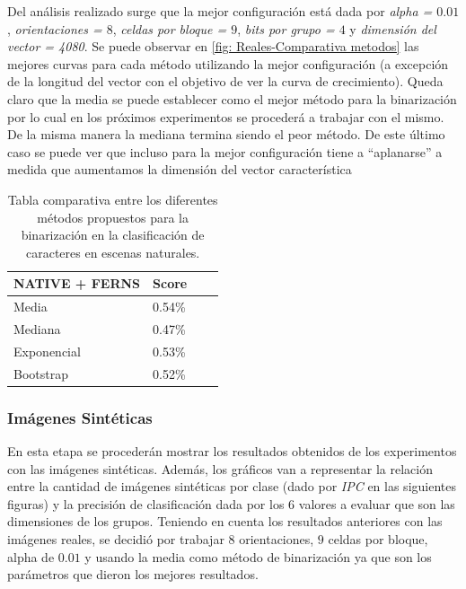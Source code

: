 	Del análisis realizado surge que la mejor configuración está dada por \textit{alpha = $0.01$}, \textit{orientaciones = $8$}, \textit{celdas por bloque = $9$}, \textit{bits por grupo = $4$} y \textit{dimensión del vector = 4080}. Se puede observar en \ref{fig: Reales-Comparativa metodos} las mejores curvas para cada método utilizando la mejor configuración (a excepción de la longitud del vector con el objetivo de ver la curva de crecimiento). Queda claro que la media se puede establecer como el mejor método para la binarización por lo cual en los próximos experimentos se procederá a trabajar con el mismo. De la misma manera la mediana termina siendo el peor método. De este último caso se puede ver que incluso para la mejor configuración tiene a ``aplanarse'' a medida que aumentamos la dimensión del vector característica
		
	\begin{table}
		\centering
		\begin{tabular}{ | l | l | l | p{5cm} |}
    			\hline
    				\textbf{NATIVE + FERNS} & \textbf{Score} \\ \hline
    				Media & 0.54\% \\ \hline
    				Mediana & 0.47\%\\ \hline
    				Exponencial & 0.53\% \\ \hline
    				Bootstrap & 0.52\%\\ 
    			\hline
    		\end{tabular}
    		\caption[Resultados imagenes naturales]{Tabla comparativa entre los diferentes métodos propuestos para la binarización en la clasificación de caracteres en escenas naturales.}
    		\label{table: reales-comparativa}
    	\end{table}
    	
    	
    	\newpage
    	\subsubsection{Imágenes Sintéticas}
    	
    En esta etapa se procederán mostrar los resultados obtenidos de los experimentos con las imágenes sintéticas. Además, los gráficos van a representar la relación entre la cantidad de imágenes sintéticas por clase (dado por \textit{IPC} en las siguientes figuras) y la precisión de clasificación dada por los $6$ valores a evaluar que son las dimensiones de los grupos. Teniendo en cuenta los resultados anteriores con las imágenes reales, se decidió por trabajar $8$ orientaciones, $9$ celdas por bloque, alpha de $0.01$ y usando la media como método de binarización ya que son los parámetros que dieron los mejores resultados.
  
